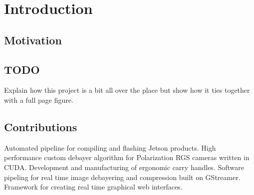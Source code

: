 \chapter{Introduction}

\section{Motivation}

\section{TODO}
Explain how this project is a bit all over the place but show how it ties together with a full page figure.



\section{Contributions}
Automated pipeline for compiling and flashing Jetson products.
High performance custom debayer algorithm for Polarization RGS cameras written in CUDA.
Development and manufacturing of ergonomic carry handles.
Software pipeling for real time image debayering and compression built on GStreamer.
Framework for creating real time graphical web interfaces.
